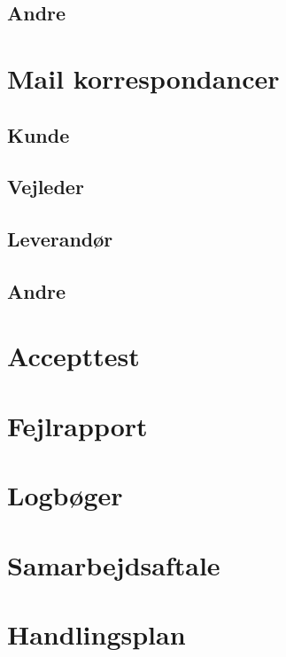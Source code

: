 \subsection{Andre}
\label{moderefAndre}

\section{Mail korrespondancer}
\label{mails}

\subsection{Kunde}
\label{mailKunde}

\subsection{Vejleder}
\label{mailvejleder}

\subsection{Leverandør}
\label{mailleverandor}

\subsection{Andre}
\label{mailAndre}

\section{Accepttest}
\label{bilag:Accepttest}

\section{Fejlrapport}
\label{bilag:Fejlrapport}

\section{Logbøger}
\label{bilag:Logboger}

\section{Samarbejdsaftale}
\label{bilag:samarbejdsaftale}

\section{Handlingsplan}
\label{bilag:Handlingsplan}